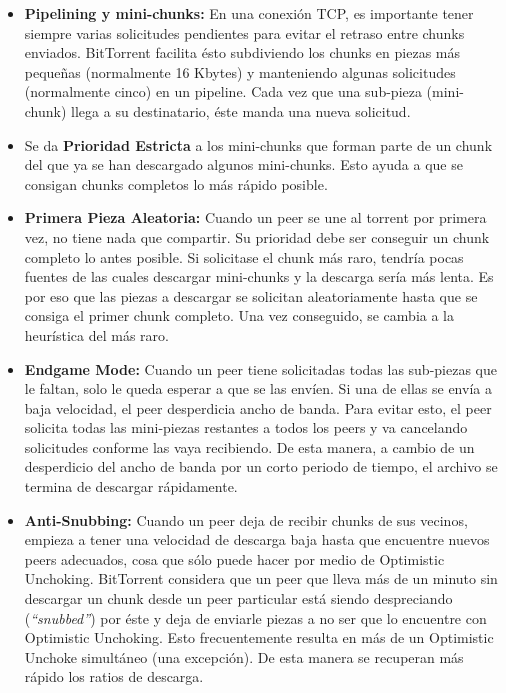 \documentclass{article}
\begin{document}
\begin{itemize}
\item \textbf{Pipelining y mini-chunks:} En una conexión TCP, es
  importante tener siempre varias solicitudes pendientes para evitar
  el retraso entre chunks enviados. BitTorrent facilita ésto
  subdiviendo los chunks en piezas más pequeñas (normalmente 16
  Kbytes) y manteniendo algunas solicitudes (normalmente cinco) en un
  pipeline. Cada vez que una sub-pieza (mini-chunk) llega a su
  destinatario, éste manda una nueva solicitud.

\item Se da \textbf{Prioridad Estricta} a los mini-chunks que forman
  parte de un chunk del que ya se han descargado algunos
  mini-chunks. Esto ayuda a que se consigan chunks completos lo más
  rápido posible.
  
\item \textbf{Primera Pieza Aleatoria:} Cuando un peer se une al
  torrent por primera vez, no tiene nada que compartir. Su prioridad
  debe ser conseguir un chunk completo lo antes posible. Si solicitase
  el chunk más raro, tendría pocas fuentes de las cuales descargar
  mini-chunks y la descarga sería más lenta. Es por eso que las piezas
  a descargar se solicitan aleatoriamente hasta que se consiga el
  primer chunk completo. Una vez conseguido, se cambia a la heurística
  del más raro.
  
\item \textbf{Endgame Mode:} Cuando un peer tiene solicitadas todas
  las sub-piezas que le faltan, solo le queda esperar a que se las
  envíen. Si una de ellas se envía a baja velocidad, el peer
  desperdicia ancho de banda. Para evitar esto, el peer solicita todas
  las mini-piezas restantes a todos los peers y va cancelando
  solicitudes conforme las vaya recibiendo. De esta manera, a cambio
  de un desperdicio del ancho de banda por un corto periodo de tiempo,
  el archivo se termina de descargar rápidamente.
  
\item \textbf{Anti-Snubbing:} Cuando un peer deja de recibir chunks de
  sus vecinos, empieza a tener una velocidad de descarga baja hasta
  que encuentre nuevos peers adecuados, cosa que sólo puede hacer por
  medio de Optimistic Unchoking. BitTorrent considera que un peer que
  lleva más de un minuto sin descargar un chunk desde un peer
  particular está siendo despreciando (\textit{``snubbed''}) por éste
  y deja de enviarle piezas a no ser que lo encuentre con Optimistic
  Unchoking. Esto frecuentemente resulta en más de un Optimistic
  Unchoke simultáneo (una excepción). De esta manera se recuperan más
  rápido los ratios de descarga.


\end{itemize}
\end{document}
